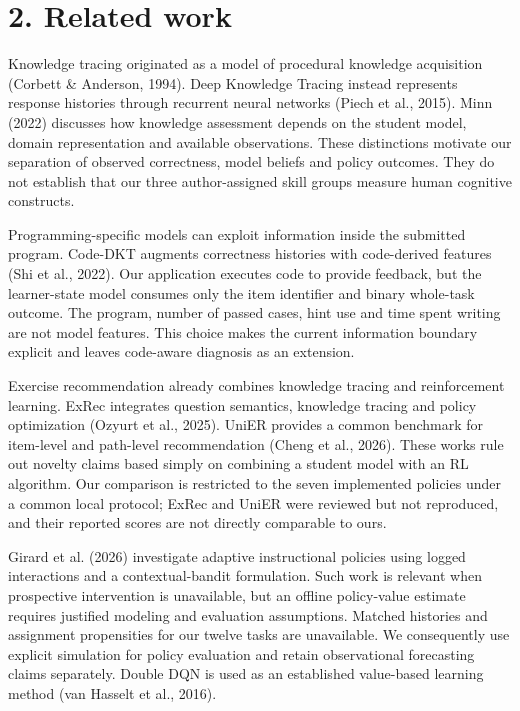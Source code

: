 \documentclass[preprint,11pt,authoryear]{elsarticle}
\begin{document}
\section*{2. Related work}

Knowledge tracing originated as a model of procedural knowledge acquisition (Corbett \& Anderson, 1994). Deep Knowledge Tracing instead represents response histories through recurrent neural networks (Piech et al., 2015). Minn (2022) discusses how knowledge assessment depends on the student model, domain representation and available observations. These distinctions motivate our separation of observed correctness, model beliefs and policy outcomes. They do not establish that our three author-assigned skill groups measure human cognitive constructs.

Programming-specific models can exploit information inside the submitted program. Code-DKT augments correctness histories with code-derived features (Shi et al., 2022). Our application executes code to provide feedback, but the learner-state model consumes only the item identifier and binary whole-task outcome. The program, number of passed cases, hint use and time spent writing are not model features. This choice makes the current information boundary explicit and leaves code-aware diagnosis as an extension.

Exercise recommendation already combines knowledge tracing and reinforcement learning. ExRec integrates question semantics, knowledge tracing and policy optimization (Ozyurt et al., 2025). UniER provides a common benchmark for item-level and path-level recommendation (Cheng et al., 2026). These works rule out novelty claims based simply on combining a student model with an RL algorithm. Our comparison is restricted to the seven implemented policies under a common local protocol; ExRec and UniER were reviewed but not reproduced, and their reported scores are not directly comparable to ours.

Girard et al. (2026) investigate adaptive instructional policies using logged interactions and a contextual-bandit formulation. Such work is relevant when prospective intervention is unavailable, but an offline policy-value estimate requires justified modeling and evaluation assumptions. Matched histories and assignment propensities for our twelve tasks are unavailable. We consequently use explicit simulation for policy evaluation and retain observational forecasting claims separately. Double DQN is used as an established value-based learning method (van Hasselt et al., 2016).
\end{document}
